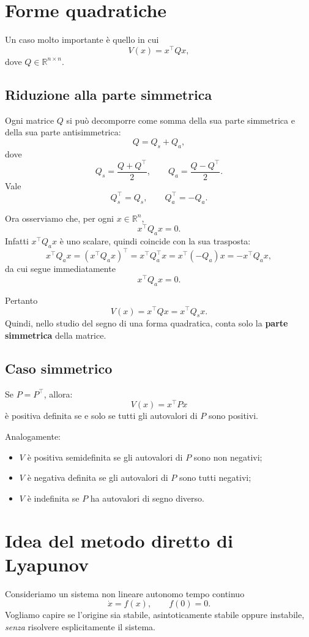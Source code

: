 \section{Forme quadratiche}

Un caso molto importante è quello in cui
\[
V(x)=x^\top Qx,
\]
dove \(Q\in\mathbb{R}^{n\times n}\).

\subsection{Riduzione alla parte simmetrica}
Ogni matrice \(Q\) si può decomporre come somma della sua parte simmetrica e della sua parte antisimmetrica:
\[
Q=Q_s+Q_a,
\]
dove
\[
Q_s=\frac{Q+Q^\top}{2},
\qquad
Q_a=\frac{Q-Q^\top}{2}.
\]
Vale
\[
Q_s^\top=Q_s,
\qquad
Q_a^\top=-Q_a.
\]

Ora osserviamo che, per ogni \(x\in\mathbb{R}^n\),
\[
x^\top Q_a x = 0.
\]
Infatti \(x^\top Q_a x\) è uno scalare, quindi coincide con la sua trasposta:
\[
x^\top Q_a x = (x^\top Q_a x)^\top = x^\top Q_a^\top x = x^\top(-Q_a)x = -x^\top Q_a x,
\]
da cui segue immediatamente
\[
x^\top Q_a x = 0.
\]

Pertanto
\[
V(x)=x^\top Qx=x^\top Q_s x.
\]
Quindi, nello studio del segno di una forma quadratica, conta solo la \textbf{parte simmetrica} della matrice.

\subsection{Caso simmetrico}
Se \(P=P^\top\), allora:
\[
V(x)=x^\top P x
\]
è positiva definita se e solo se tutti gli autovalori di \(P\) sono positivi.

Analogamente:
\begin{itemize}
    \item \(V\) è positiva semidefinita se gli autovalori di \(P\) sono non negativi;
    \item \(V\) è negativa definita se gli autovalori di \(P\) sono tutti negativi;
    \item \(V\) è indefinita se \(P\) ha autovalori di segno diverso.
\end{itemize}

\section{Idea del metodo diretto di Lyapunov}

Consideriamo un sistema non lineare autonomo tempo continuo
\[
\dot x = f(x),
\qquad
f(0)=0.
\]
Vogliamo capire se l'origine sia stabile, asintoticamente stabile oppure instabile, \emph{senza} risolvere esplicitamente il sistema.

